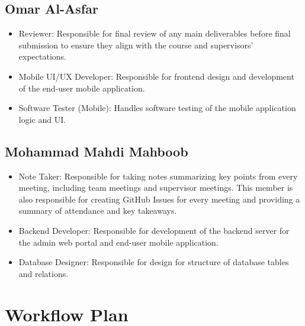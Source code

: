 \documentclass{article}
\begin{document}
\begin{flushleft}
\subsection{Omar Al-Asfar}
\begin{itemize}
  \item Reviewer: Responsible for final review of any main deliverables before final submission to ensure they align with the course and supervisors’ expectations.
  \item Mobile UI/UX Developer: Responsible for frontend design and development of the end-user mobile application.
  \item Software Tester (Mobile): Handles software testing of the mobile application logic and UI.
\end{itemize}

\subsection{Mohammad Mahdi Mahboob}
\begin{itemize}
  \item Note Taker: Responsible for taking notes summarizing key points from every meeting, including team meetings and supervisor meetings.
  This member is also responsible for creating GitHub Issues for every meeting and providing a summary of attendance and key takeaways.
  \item Backend Developer: Responsible for development of the backend server for the admin web portal and end-user mobile application.
  \item Database Designer: Responsible for design for structure of database tables and relations.
\end{itemize}
\end{flushleft}

\section{Workflow Plan}
\end{document}
